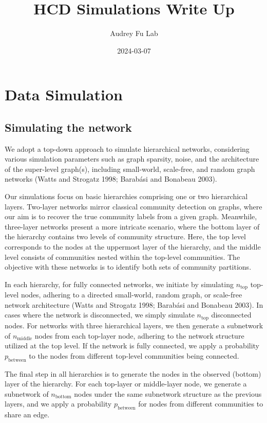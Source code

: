 \documentclass[
]{article}
\title{HCD Simulations Write Up}
\author{Audrey Fu Lab}
\date{2024-03-07}
\begin{document}
\maketitle

\section*{Data Simulation}

\subsection*{Simulating the network}

We adopt a top-down approach to simulate hierarchical networks,
considering various simulation parameters such as graph sparsity, noise,
and the architecture of the super-level graph(s), including small-world,
scale-free, and random graph networks (Watts and Strogatz 1998; Barabási
and Bonabeau 2003).

Our simulations focus on basic hierarchies comprising one or two
hierarchical layers. Two-layer networks mirror classical community
detection on graphs, where our aim is to recover the true community
labels from a given graph. Meanwhile, three-layer networks present a
more intricate scenario, where the bottom layer of the hierarchy
contains two levels of community structure. Here, the top level
corresponds to the nodes at the uppermost layer of the hierarchy, and
the middle level consists of communities nested within the top-level
communities. The objective with these networks is to identify both sets
of community partitions.

In each hierarchy, for fully connected networks, we initiate by
simulating \(n_{\text{top}}\) top-level nodes, adhering to a directed
small-world, random graph, or scale-free network architecture (Watts and
Strogatz 1998; Barabási and Bonabeau 2003). In cases where the network
is disconnected, we simply simulate \(n_{\text{top}}\) disconnected
nodes. For networks with three hierarchical layers, we then generate a
subnetwork of \(n_{\text{middle}}\) nodes from each top-layer node,
adhering to the network structure utilized at the top level. If the
network is fully connected, we apply a probability \(p_\text{between}\)
to the nodes from different top-level communities being connected.

The final step in all hierarchies is to generate the nodes in the
observed (bottom) layer of the hierarchy. For each top-layer or
middle-layer node, we generate a subnetwork of \(n_{\text{bottom}}\)
nodes under the same subnetwork structure as the previous layers, and we
apply a probability \(p_\text{between}\) for nodes from different
communities to share an edge.
\end{document}

